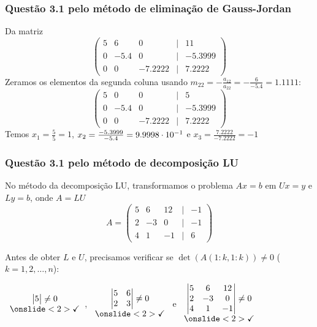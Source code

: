 \begin{frame}
\frametitle{Questão 3.1 pelo método de eliminação de Gauss-Jordan}
Da matriz
\[
\begin{pmatrix}
5 & 6 & 0 & | & 11\\
0 & -5.4 & 0 & | & -5.3999\\
0 & 0 & -7.2222 & | & 7.2222 
\end{pmatrix}
\]
Zeramos os elementos da segunda coluna usando $m_{22}=-\frac{a_{12}}{a_{22}}=-\frac{6}{-5.4}=1.1111$:
\[
\begin{pmatrix}
5 & 0 & 0 & | & 5\\
0 & -5.4 & 0 & | & -5.3999\\
0 & 0 & -7.2222 & | & 7.2222 
\end{pmatrix}
\]
%
Temos $x_1=\frac{5}{5}=1$, $x_2=\frac{-5.3999}{-5.4}=9.9998 \cdot 10^{-1}$ e $x_3=\frac{7.2222}{-7.2222}=-1$
\end{frame}


\begin{frame}
\frametitle{Questão 3.1 pelo método de decomposição LU}
No método da decomposição LU, transformamos o problema $Ax = b$ em $Ux = y$ e $Ly = b$, onde $A = LU$
\[A = 
\begin{pmatrix}
5 & 6 & 12 & | & -1\\
2 & -3 & 0 & | & -1\\
4 & 1 & -1 & | & 6 
\end{pmatrix}
\]

Antes de obter $L$ e $U$, precisamos verificar se $\det(A(1:k,1:k)) \ne 0$ ($k=1,2,\ldots,n$):

$
\begin{array}{c}
\begin{vmatrix}
5
\end{vmatrix} \ne 0\\
%
\onslide<2>{\text{\ok}}
\end{array}
$,%
%
$
\begin{array}{c}
\begin{vmatrix}
5 & 6 \\
2 & 3
\end{vmatrix} \ne 0\\
%
\onslide<2>{\text{\ok}}
\end{array}
$
e
$
\begin{array}{c}
\begin{vmatrix}
5 &6 &12\\
2 &-3 &0\\
4 &1 &-1
\end{vmatrix} \ne 0\\
%
\onslide<2>{\text{\ok}}
\end{array}
$

\end{frame}

